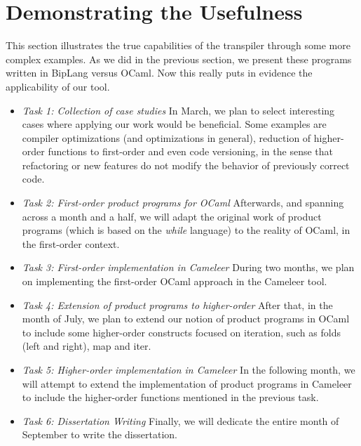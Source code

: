 \section{Demonstrating the Usefulness}
\label{sec:applicability}

This section illustrates the true capabilities of the transpiler through some more complex examples.
As we did in the previous section, we present these programs written in BipLang versus OCaml.
Now this really puts in evidence the applicability of our tool.










\iffalse
\begin{itemize}
    \setlength\itemsep{0bp}

    \item{\emph{Task 1: Collection of case studies}}\hspace{1em}
    In March, we plan to select interesting cases where applying our work would be beneficial. 
    Some examples are compiler optimizations (and optimizations in general), reduction of higher-order functions to first-order and even code versioning, in the sense that refactoring or new features do not modify the behavior of previously correct code.

    \item \emph{Task 2: First-order product programs for OCaml}\hspace{1em} 
    Afterwards, and spanning across a month and a half, we will adapt the original work of product programs (which is based on the \emph{while} language) to the reality of OCaml, in the first-order context.

    \item \emph{Task 3: First-order implementation in Cameleer}\hspace{1em} 
    During two months, we plan on implementing the first-order OCaml approach in the Cameleer tool.

    \item \emph{Task 4: Extension of product programs to higher-order}\hspace{1em} 
    After that, in the month of July, we plan to extend our notion of product programs in OCaml to include some higher-order constructs focused on iteration, such as folds (left and right), map and iter.

    \item \emph{Task 5: Higher-order implementation in Cameleer}\hspace{1em} 
    In the following month, we will attempt to extend the implementation of product programs in Cameleer to include the higher-order functions mentioned in the previous task.

    \item \emph{Task 6: Dissertation Writing}\hspace{1em} 
    Finally, we will dedicate the entire month of September to write the dissertation.

\end{itemize}
  
